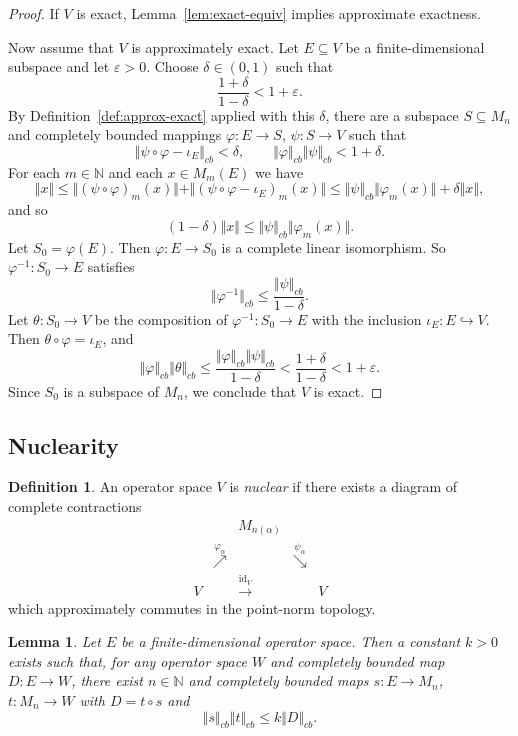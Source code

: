 \documentclass[12pt]{article}
\newtheorem{lemma}[theorem]{Lemma}
\theoremstyle{definition}
\newtheorem{definition}[theorem]{Definition}
\theoremstyle{remark}
\begin{document}
\begin{proof}
If $V$ is exact, Lemma~\ref{lem:exact-equiv} implies approximate exactness.

Now assume that $V$ is approximately exact. Let $E\subseteq V$ be a
finite-dimensional subspace and let $\varepsilon>0$. Choose
$\delta\in(0,1)$ such that
\[
\frac{1+\delta}{1-\delta}<1+\varepsilon.
\]
By Definition~\ref{def:approx-exact} applied with this $\delta$, there are a subspace
$S\subseteq M_n$ and completely bounded mappings
$\varphi:E\to S$, $\psi:S\to V$ such that
\[
\Vert\psi\circ\varphi-\iota_E\Vert_{cb}<\delta,
\qquad
\Vert\varphi\Vert_{cb}\Vert\psi\Vert_{cb}<1+\delta.
\]
For each $m\in\mathbb{N}$ and each $x\in M_m(E)$ we
have
\[
\Vert x\Vert\le\Vert(\psi\circ\varphi)_m(x)\Vert
+\Vert(\psi\circ\varphi-\iota_E)_m(x)\Vert
\le\Vert\psi\Vert_{cb}\Vert\varphi_m(x)\Vert+\delta\Vert x\Vert,
\]
and so
\[
(1-\delta)\Vert x\Vert\le\Vert\psi\Vert_{cb}\Vert\varphi_m(x)\Vert.
\]
Let $S_0=\varphi(E)$. Then $\varphi:E\to S_0$ is a complete linear
isomorphism. So $\varphi^{-1}:S_0\to E$ satisfies
\[
\Vert\varphi^{-1}\Vert_{cb}
\le\frac{\Vert\psi\Vert_{cb}}{1-\delta}.
\]
Let $\theta:S_0\to V$ be the composition of $\varphi^{-1}:S_0\to E$ with
the inclusion $\iota_{E}: E\hookrightarrow V$. Then $\theta\circ\varphi=\iota_E$, and
\[
\Vert\varphi\Vert_{cb}\Vert\theta\Vert_{cb}
\le\frac{\Vert\varphi\Vert_{cb}\Vert\psi\Vert_{cb}}{1-\delta}
<\frac{1+\delta}{1-\delta}<1+\varepsilon.
\]
Since $S_0$ is a subspace of $M_n$, we conclude that $V$ is exact.
\end{proof}

\subsection{Nuclearity}\label{sec:nuclearity}

\begin{definition}\label{def:nuclear}
An operator space $V$ is \emph{nuclear} if
there exists a diagram of complete contractions
\[
\begin{array}{ccccc}
&& M_{n(\alpha)} && \\
&\stackrel{\varphi_\alpha}{ \nearrow }& & \stackrel{ \psi_\alpha}{\searrow}& \\
V && \xrightarrow{\mathrm{id}_V} & &V
\end{array}
\]
which approximately commutes in the point-norm topology.
\end{definition}

\begin{lemma}\label{lem:finite-factor}
Let $E$ be a finite-dimensional operator space. Then a constant
$k>0$ exists such that, for any operator space $W$ and completely
bounded map $D:E\to W$, there exist $n\in\mathbb N$ and completely bounded maps
$s:E\to M_n$, $t:M_n\to W$ with $D=t\circ s$ and
\[
\Vert s\Vert_{cb}\Vert t\Vert_{cb}\le k\Vert D\Vert_{cb}.
\]
\end{lemma}
\end{document}
